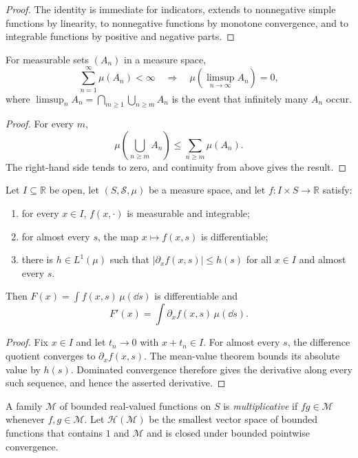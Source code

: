 \begin{proof}
The identity is immediate for indicators, extends to nonnegative simple
functions by linearity, to nonnegative functions by monotone convergence, and
to integrable functions by positive and negative parts.
\end{proof}

\begin{lem}
For measurable sets $(A_n)$ in a measure space,
\[
\sum_{n=1}^{\infty}\mu(A_n)<\infty
\quad\Longrightarrow\quad
\mu(\limsup_{n\to\infty}A_n)=0,
\]
where
$\limsup_nA_n=\bigcap_{m\ge1}\bigcup_{n\ge m}A_n$ is the event that infinitely
many $A_n$ occur.
\end{lem}

\begin{proof}
For every $m$,
\[
\mu\!\left(\bigcup_{n\ge m}A_n\right)
 \leq\sum_{n\ge m}\mu(A_n).
\]
The right-hand side tends to zero, and continuity from above gives the
result.
\end{proof}

\begin{thm}
Let $I\subseteq\mathbb R$ be open, let $(S,\mathcal S,\mu)$ be a measure
space, and let $f:I\times S\to\mathbb R$ satisfy:
\begin{enumerate}[label=(\roman*)]
  \item for every $x\in I$, $f(x,\cdot)$ is measurable and integrable;
  \item for almost every $s$, the map $x\mapsto f(x,s)$ is differentiable;
  \item there is $h\in L^1(\mu)$ such that
  $|\partial_x f(x,s)|\leq h(s)$ for all $x\in I$ and almost every $s$.
\end{enumerate}
Then $F(x)=\int f(x,s)\,\mu(\dd s)$ is differentiable and
\[
F'(x)=\int \partial_xf(x,s)\,\mu(\dd s).
\]
\end{thm}

\begin{proof}
Fix $x\in I$ and let $t_n\to0$ with $x+t_n\in I$. For almost every $s$, the
difference quotient converges to $\partial_xf(x,s)$. The mean-value theorem
bounds its absolute value by $h(s)$. Dominated convergence therefore gives
the derivative along every such sequence, and hence the asserted derivative.
\end{proof}

\begin{de}
A family $\mathcal M$ of bounded real-valued functions on $S$ is
\emph{multiplicative} if $fg\in\mathcal M$ whenever $f,g\in\mathcal M$.
Let $\mathcal H(\mathcal M)$ be the smallest vector space of bounded
functions that contains $1$ and $\mathcal M$ and is closed under bounded
pointwise convergence.
\end{de}

